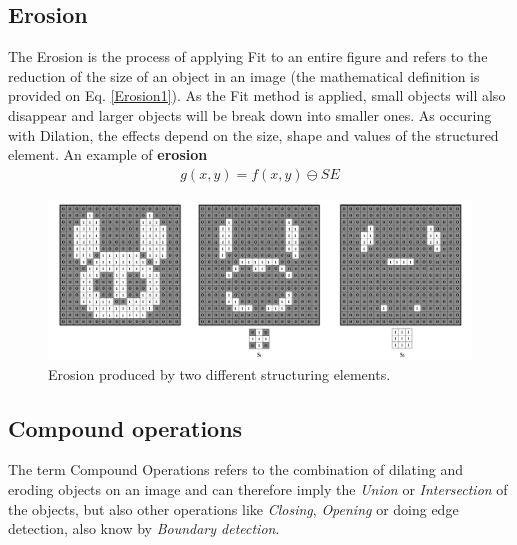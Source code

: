 \subsection{Erosion}
The Erosion is the process of applying Fit to an entire figure and refers to the reduction of the size of an object in an image (the mathematical definition is provided on Eq. \ref{Erosion1}). As the Fit method is applied, small objects will also disappear and larger objects will be break down into smaller ones. As occuring with Dilation, the effects depend on the size, shape and values of the structured element. An example of \textbf{erosion}
\begin{equation}
\begin{aligned}
{g(x, y)}={f(x,y)}\ominus{SE}
\label{Erosion1}
	\end{aligned}
\end{equation}

\begin{figure}[htbp]
\centering
\includegraphics[width=1\textwidth]{Pictures/Theory/Erosion.png}
\caption{Erosion produced by two different structuring elements.}
\label{fig:Erosion}
\end{figure}

\subsection{Compound operations}
The term Compound Operations refers to the combination of dilating and eroding objects on an image and can therefore imply the \textit{Union} or \textit{Intersection} of the objects, but also other operations like \textit{Closing}, \textit{Opening} or doing edge detection, also know by \textit{Boundary detection}.
